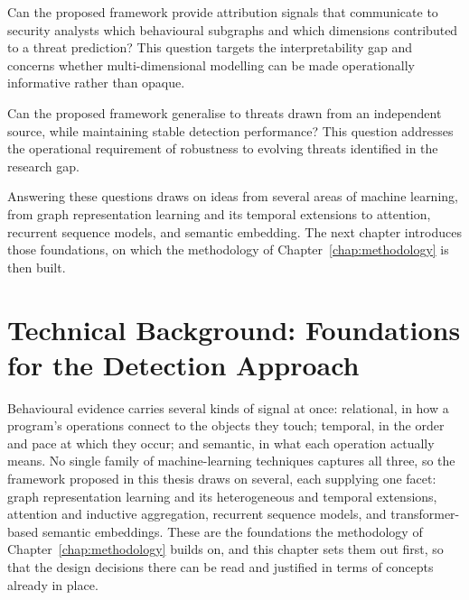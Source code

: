 \documentclass[%
    BCOR=10mm,
    DIV=13,
    toc=bibliography,
    toc=listof,
    oneside,
    12pt,
]{scrbook}
\begin{document}
\begin{description}[leftmargin=0pt, labelwidth=0pt, labelsep=\parskip, style=nextline]
\item[\textbf{RQ4 -- Model Interpretability.}]
Can the proposed framework provide attribution signals that communicate to
security analysts which behavioural subgraphs and which dimensions contributed
to a threat prediction? This question targets the interpretability gap and
concerns whether multi-dimensional modelling can be made operationally
informative rather than opaque.

\item[\textbf{RQ5 -- Cross-Source Generalisation.}]
Can the proposed framework generalise to threats drawn from an independent
source, while maintaining stable detection performance? This question
addresses the operational requirement of robustness to evolving threats
identified in the research gap.

\end{description}

Answering these questions draws on ideas from several areas of machine learning,
from graph representation learning and its temporal extensions to attention,
recurrent sequence models, and semantic embedding. The next chapter introduces
those foundations, on which the methodology of Chapter~\ref{chap:methodology} is
then built.

\chapter{Technical Background: Foundations for the Detection Approach}
\label{chap:theory}

Behavioural evidence carries several kinds of signal at once: relational, in how
a program's operations connect to the objects they touch; temporal, in the order
and pace at which they occur; and semantic, in what each operation actually
means. No single family of machine-learning techniques captures all three, so the
framework proposed in this thesis draws on several, each supplying one facet:
graph representation learning and its heterogeneous and temporal extensions,
attention and inductive aggregation, recurrent sequence models, and
transformer-based semantic embeddings. These are the foundations the methodology
of Chapter~\ref{chap:methodology} builds on, and this chapter sets them out first,
so that the design decisions there can be read and justified in terms of concepts
already in place.
\end{document}
